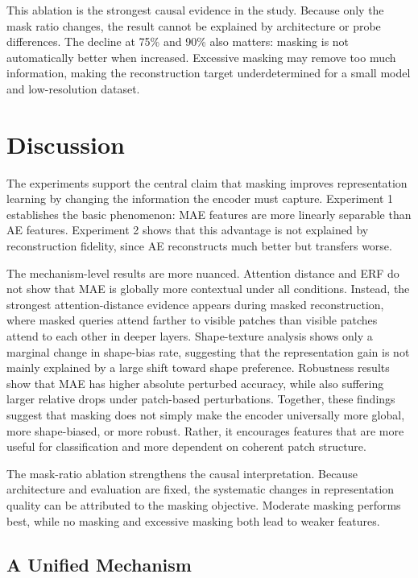 \documentclass[10pt,twocolumn,letterpaper]{article}
\begin{document}
This ablation is the strongest causal evidence in the study. Because only the mask ratio changes, the result cannot be explained by architecture or probe differences. The decline at 75\% and 90\% also matters: masking is not automatically better when increased. Excessive masking may remove too much information, making the reconstruction target underdetermined for a small model and low-resolution dataset.

\section{Discussion}

The experiments support the central claim that masking improves representation learning by changing the information the encoder must capture. Experiment 1 establishes the basic phenomenon: MAE features are more linearly separable than AE features. Experiment 2 shows that this advantage is not explained by reconstruction fidelity, since AE reconstructs much better but transfers worse.

The mechanism-level results are more nuanced. Attention distance and ERF do not show that MAE is globally more contextual under all conditions. Instead, the strongest attention-distance evidence appears during masked reconstruction, where masked queries attend farther to visible patches than visible patches attend to each other in deeper layers. Shape-texture analysis shows only a marginal change in shape-bias rate, suggesting that the representation gain is not mainly explained by a large shift toward shape preference. Robustness results show that MAE has higher absolute perturbed accuracy, while also suffering larger relative drops under patch-based perturbations. Together, these findings suggest that masking does not simply make the encoder universally more global, more shape-biased, or more robust. Rather, it encourages features that are more useful for classification and more dependent on coherent patch structure.

The mask-ratio ablation strengthens the causal interpretation. Because architecture and evaluation are fixed, the systematic changes in representation quality can be attributed to the masking objective. Moderate masking performs best, while no masking and excessive masking both lead to weaker features.

\subsection{A Unified Mechanism}
\end{document}
